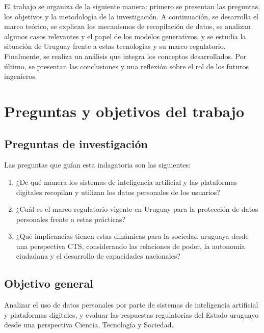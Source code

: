 \documentclass[11pt,a4paper]{article}
\begin{document}
El trabajo se organiza de la siguiente manera: primero se presentan las preguntas, los objetivos y la metodología de la investigación. A continuación, se desarrolla el marco teórico, se explican los mecanismos de recopilación de datos, se analizan algunos casos relevantes y el papel de los modelos generativos, y se estudia la situación de Uruguay frente a estas tecnologías y su marco regulatorio. Finalmente, se realiza un análisis que integra los conceptos desarrollados. Por último, se presentan las conclusiones y una reflexión sobre el rol de los futuros ingenieros.

\section{Preguntas y objetivos del trabajo}

\subsection{Preguntas de investigación}

Las preguntas que guían esta indagatoria son las siguientes:

\begin{enumerate}
    \item ¿De qué manera los sistemas de inteligencia artificial y las plataformas digitales recopilan y utilizan los datos personales de los usuarios?
    \item ¿Cuál es el marco regulatorio vigente en Uruguay para la protección de datos personales frente a estas prácticas?
    \item ¿Qué implicancias tienen estas dinámicas para la sociedad uruguaya desde una perspectiva CTS, considerando las relaciones de poder, la autonomía ciudadana y el desarrollo de capacidades nacionales?
\end{enumerate}

\subsection{Objetivo general}

Analizar el uso de datos personales por parte de sistemas de inteligencia artificial y plataformas digitales, y evaluar las respuestas regulatorias del Estado uruguayo desde una perspectiva Ciencia, Tecnología y Sociedad.
\end{document}
